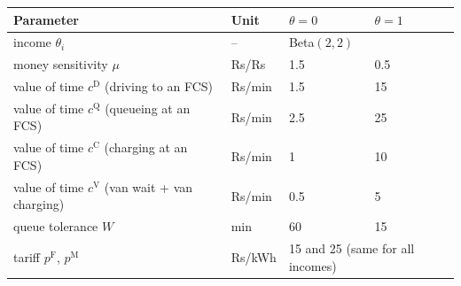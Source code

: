 \begin{tabular}{@{}llll@{}}
\toprule
Parameter & Unit & $\theta=0$ & $\theta=1$ \\
\midrule
income $\theta_i$ & -- & \multicolumn{2}{l}{Beta$(2,2)$} \\
money sensitivity $\mu$ & Rs/Rs & 1.5 & 0.5 \\
value of time $c^{\mathrm D}$ (driving to an FCS) & Rs/min & 1.5 & 15 \\
value of time $c^{\mathrm Q}$ (queueing at an FCS) & Rs/min & 2.5 & 25 \\
value of time $c^{\mathrm C}$ (charging at an FCS) & Rs/min & 1 & 10 \\
value of time $c^{\mathrm V}$ (van wait + van charging) & Rs/min & 0.5 & 5 \\
queue tolerance $W$ & min & 60 & 15 \\
tariff $p^{\mathrm F}$, $p^{\mathrm M}$ & Rs/kWh & \multicolumn{2}{l}{15 and 25 (same for all incomes)} \\
\bottomrule
\end{tabular}
